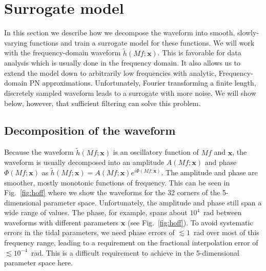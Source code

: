\documentclass[prd,aps,letter,twocolumn,floatfix,notitlepage,nofootinbib]{revtex4-1}
\def\bx{\mathbf{x}}
\begin{document}
\section{Surrogate model}

In this section we describe how we decompose the waveform into smooth, slowly-varying functions and train a surrogate model for these functions. We will work with the frequency-domain waveform $\tilde h(Mf; \bx)$. This is favorable for data analysis which is usually done in the frequency domain. It also allows us to extend the model down to arbitrarily low frequencies with analytic, Frequency-domain PN approximations. Unfortunately, Fourier transforming a finite length, discretely sampled waveform leads to a surrogate with more noise. We will show below, however, that sufficient filtering can solve this problem.


\subsection{Decomposition of the waveform}

Because the waveform $\tilde h(Mf; \bx)$ is an oscillatory function of $Mf$ and $\bx$, the waveform is usually decomposed into an amplitude $A(Mf; \bx)$ and phase $\Phi(Mf; \bx)$ as $\tilde h(Mf; \bx) = A(Mf; \bx) e^{i\Phi(Mf; \bx)}$. The amplitude and phase are smoother, mostly monotonic functions of frequency. This can be seen in Fig.~\ref{fig:hoff} where we show the waveforms for the 32 corners of the 5-dimensional parameter space. Unfortunately, the amplitude and phase still span a wide range of values. The phase, for example, spans about $10^4$~rad between waveforms with different parameters $\bx$ (see Fig.~\ref{fig:hoff}). To avoid systematic errors in the tidal parameters, we need phase errors of $\lesssim 1$~rad over most of this frequency range, leading to a requirement on the fractional interpolation error of $\lesssim 10^{-4}$~rad. This is a difficult requirement to achieve in the 5-dimensional parameter space here. 
\end{document}
